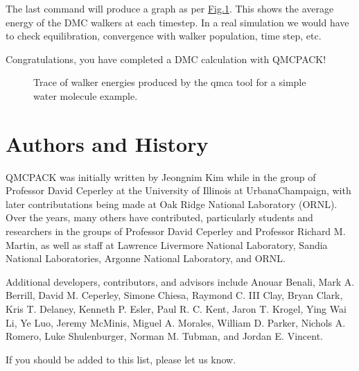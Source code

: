\documentclass[letterpaper,10pt,english]{sphinxmanual}
\let\sphinxpxdimen\pdfpxdimen\else\newdimen\sphinxpxdimen
\begin{document}
The last command will produce a graph as per
\hyperref[\detokenize{introduction:fig1}]{Fig.\@ \ref{\detokenize{introduction:fig1}}}. This
shows the average energy of the DMC walkers at each timestep. In a real
simulation we would have to check equilibration, convergence with walker
population, time step, etc.

Congratulations, you have completed a DMC calculation with QMCPACK!

\begin{figure}[htbp]
\centering
\capstart

\noindent\sphinxincludegraphics[width=400\sphinxpxdimen]{{quick_qmca_dmc_trace}.png}
\caption{Trace of walker energies produced by the qmca tool for a simple water
molecule example.}\label{\detokenize{introduction:id3}}\label{\detokenize{introduction:fig1}}\end{figure}


\section{Authors and History}
\label{\detokenize{introduction:authors-and-history}}\label{\detokenize{introduction:history}}
QMCPACK was initially written by Jeongnim Kim while in the group of
Professor David Ceperley at the University of Illinois at
Urbana\sphinxhyphen{}Champaign, with later contributations being made at Oak Ridge
National Laboratory (ORNL). Over the years, many others have
contributed, particularly students and researchers in the groups of
Professor David Ceperley and Professor Richard M. Martin, as well as
staff at Lawrence Livermore National Laboratory, Sandia National
Laboratories, Argonne National Laboratory, and ORNL.

Additional developers, contributors, and advisors include Anouar Benali,
Mark A. Berrill, David M. Ceperley, Simone Chiesa, Raymond C. III Clay,
Bryan Clark, Kris T. Delaney, Kenneth P. Esler, Paul R. C. Kent, Jaron
T. Krogel, Ying Wai Li, Ye Luo, Jeremy McMinis, Miguel A. Morales,
William D. Parker, Nichols A. Romero, Luke Shulenburger, Norman M.
Tubman, and Jordan E. Vincent.

If you should be added to this list, please let us know.
\end{document}
